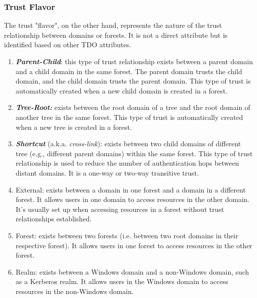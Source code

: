 \subsubsection{Trust Flavor}

The trust "flavor", on the other hand, represents the nature of the trust relationship between domains or forests. It is not a direct attribute but is identified based on other TDO attributes.
\begin{enumerate}
    \item \textit{\textbf{Parent-Child}}: this type of trust relationship exists between a parent domain and a child domain in the same forest. The parent domain trusts the child domain, and the child domain trusts the parent domain. This type of trust is automatically created when a new child domain is created in a forest.
    \item \textit{\textbf{Tree-Root:}} exists between the root domain of a tree and the root domain of another tree in the same forest. This type of trust is automatically created when a new tree is created in a forest.
    \item \textit{\textbf{Shortcut}} (a.k.a. \textit{cross-link}): exists between two child domains of different tree (e.g., different parent domains) within the same forest. This type of trust relationship is used to reduce the number of authentication hops between distant domains. It is a one-way or two-way transitive trust.
    \item External: exists between a domain in one forest and a domain in a different forest. It allows users in one domain to access resources in the other domain. It's usually set up when accessing resources in a forest without trust relationships established.
    \item Forest: exists between two forests (i.e. between two root domains in their respective forest). It allows users in one forest to access resources in the other forest.
    \item Realm: exists between a Windows domain and a non-Windows domain, such as a Kerberos realm. It allows users in the Windows domain to access resources in the non-Windows domain.
\end{enumerate}



